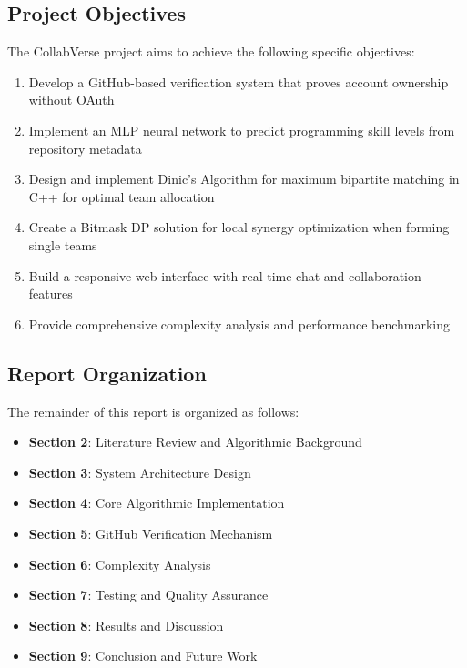 \documentclass[12pt,a4paper]{article}
\begin{document}
\subsection{Project Objectives}
The CollabVerse project aims to achieve the following specific objectives:

\begin{enumerate}
    \item Develop a GitHub-based verification system that proves account ownership without OAuth
    \item Implement an MLP neural network to predict programming skill levels from repository metadata
    \item Design and implement Dinic's Algorithm for maximum bipartite matching in C++ for optimal team allocation
    \item Create a Bitmask DP solution for local synergy optimization when forming single teams
    \item Build a responsive web interface with real-time chat and collaboration features
    \item Provide comprehensive complexity analysis and performance benchmarking
\end{enumerate}

\subsection{Report Organization}
The remainder of this report is organized as follows:
\begin{itemize}
    \item \textbf{Section 2}: Literature Review and Algorithmic Background
    \item \textbf{Section 3}: System Architecture Design
    \item \textbf{Section 4}: Core Algorithmic Implementation
    \item \textbf{Section 5}: GitHub Verification Mechanism
    \item \textbf{Section 6}: Complexity Analysis
    \item \textbf{Section 7}: Testing and Quality Assurance
    \item \textbf{Section 8}: Results and Discussion
    \item \textbf{Section 9}: Conclusion and Future Work
\end{itemize}

\end{document}

